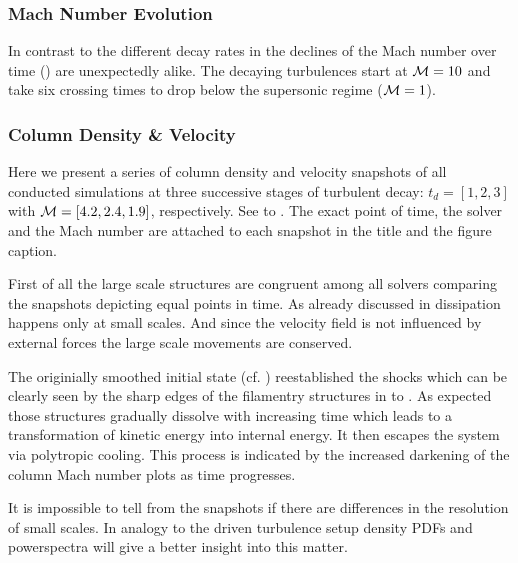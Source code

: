 \subsubsection{Mach Number Evolution}
In contrast to the different decay rates in
 the declines of the Mach number
over time () are unexpectedly alike.  The
decaying turbulences start at $\mathcal{M} = 10$ and take six crossing times to drop
below the supersonic regime ($\mathcal{M} = 1$). 

\subsubsection{Column Density \& Velocity}
\label{sec:decayturb-column-plots}
Here we present a series of column density and velocity snapshots of all
conducted simulations at three successive stages of turbulent decay: $t_d =
[1,2,3]$ with $\mathcal{M} = [4.2,2.4,1.9]$, respectively. See
 to .
The exact point of time, the solver and the Mach number are attached to each
snapshot in the title and the figure caption.

First of all the large scale structures are congruent among all solvers
comparing the snapshots depicting equal points in time. As already discussed
in  dissipation happens only at small scales.
And since the velocity field is not influenced by external forces the large
scale movements are conserved.

The originially smoothed initial state (cf.
) reestablished the shocks
which can be clearly seen by the sharp edges of the filamentry structures in
 to .
As expected those structures gradually dissolve with increasing time which
leads to a transformation of kinetic energy into internal energy. It then
escapes the system via polytropic cooling. This process is indicated by
the increased darkening of the column Mach number plots as time progresses.

It is impossible to tell from the snapshots if there are differences in
the resolution of small scales. In analogy to the driven turbulence setup
density PDFs and powerspectra will give a better insight into this matter.


